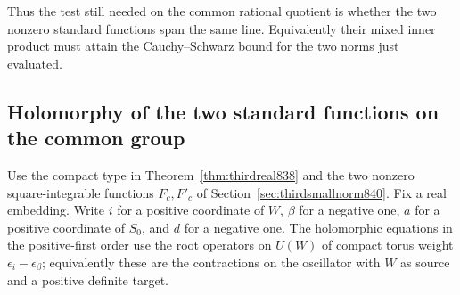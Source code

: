 \documentclass[a4paper,11pt]{article}
\theoremstyle{definition}
\theoremstyle{remark}
\numberwithin{equation}{section}
\begin{document}
Thus the test still needed on the common rational quotient is
whether the two nonzero standard functions span the same line.
Equivalently their mixed inner product must attain the
Cauchy--Schwarz bound for the two norms just evaluated.
\clearpage

\subsection{Holomorphy of the two standard functions on the common group}
\label{sec:thirdholomorphic841}
Use the compact type in Theorem~\ref{thm:thirdreal838} and
the two nonzero square-integrable functions \(F_c,F'_c\)
of Section~\ref{sec:thirdsmallnorm840}. Fix a real embedding.
Write \(i\) for a positive coordinate of \(W\), \(\beta\)
for a negative one, \(a\) for a positive coordinate of
\(S_0\), and \(d\) for a negative one. The holomorphic
equations in the positive-first order use the root operators
on \(U(W)\) of compact torus weight \(\epsilon_i-\epsilon_\beta\);
equivalently these are the contractions on the oscillator
with \(W\) as source and a positive definite target.
\end{document}
